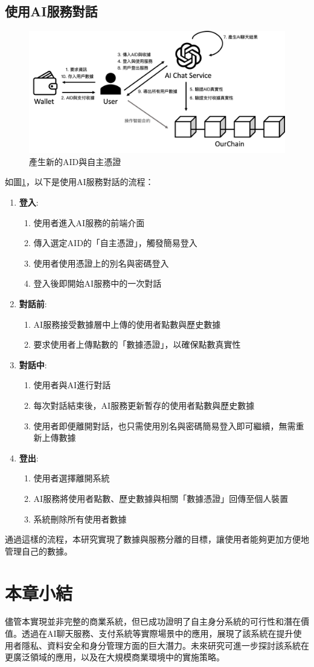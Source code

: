 \subsection{使用AI服務對話}
\begin{figure}
  \centering
  \includegraphics[width=\linewidth, keepaspectratio]{figures/implement-3.png}
  \caption{產生新的AID與自主憑證}
  \label{fig:implement-3}
\end{figure}
如圖\ref{fig:implement-3}，以下是使用AI服務對話的流程：
\begin{enumerate}
  \item \textbf{登入}:
        \begin{enumerate}
          \item 使用者進入AI服務的前端介面
          \item 傳入選定AID的「自主憑證」，觸發簡易登入
          \item 使用者使用憑證上的別名與密碼登入
          \item 登入後即開始AI服務中的一次對話
        \end{enumerate}
  \item \textbf{對話前}:
        \begin{enumerate}
          \item AI服務接受數據層中上傳的使用者點數與歷史數據
          \item 要求使用者上傳點數的「數據憑證」，以確保點數真實性
        \end{enumerate}
  \item \textbf{對話中}:
        \begin{enumerate}
          \item 使用者與AI進行對話
          \item 每次對話結束後，AI服務更新暫存的使用者點數與歷史數據
          \item 使用者即便離開對話，也只需使用別名與密碼簡易登入即可繼續，無需重新上傳數據
        \end{enumerate}
  \item \textbf{登出}:
        \begin{enumerate}
          \item 使用者選擇離開系統
          \item AI服務將使用者點數、歷史數據與相關「數據憑證」回傳至個人裝置
          \item 系統刪除所有使用者數據
        \end{enumerate}
\end{enumerate}
通過這樣的流程，本研究實現了數據與服務分離的目標，讓使用者能夠更加方便地管理自己的數據。
\section{本章小結}
儘管本實現並非完整的商業系統，但已成功證明了自主身分系統的可行性和潛在價值。透過在AI聊天服務、支付系統等實際場景中的應用，展現了該系統在提升使用者隱私、資料安全和身分管理方面的巨大潛力。未來研究可進一步探討該系統在更廣泛領域的應用，以及在大規模商業環境中的實施策略。